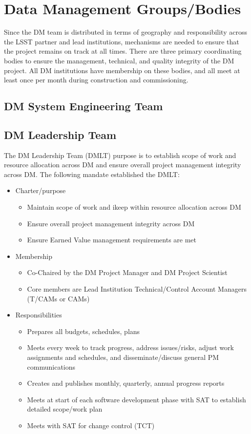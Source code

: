 \section{Data Management Groups/Bodies}
Since the DM team is distributed in terms of geography and responsibility across the LSST partner and lead institutions, mechanisms are needed to ensure that the project remains on track at all times.  There are three primary coordinating bodies to ensure the management, technical, and quality integrity of the DM project.  All DM institutions have membership on these bodies, and all meet at least once per month during construction and commissioning.

\subsection{DM System Engineering Team \label{sect:sysengt}}

\subsection{DM Leadership Team}

The DM Leadership Team (DMLT) purpose is to establish scope of work and resource allocation across DM and ensure overall project management integrity across DM.
The following mandate established the DMLT:

\begin{itemize}
\item Charter/purpose
	\begin{itemize}
	\item Maintain scope of work and ikeep within resource allocation across DM
	\item Ensure overall project management integrity across DM
	\item Ensure Earned Value management requirements are met
	\end{itemize}
\item Membership
	\begin{itemize}
	\item Co-Chaired by the DM Project Manager  and  DM Project Scientist
	\item Core members are Lead Institution Technical/Control Account Managers (T/CAMs or CAMs)
	\end{itemize}
\item Responsibilities
	\begin{itemize}
	\item Prepares all budgets, schedules, plans
	\item Meets every week to track progress, address issues/risks, adjust work assignments and schedules, and disseminate/discuss general PM communications
	\item Creates and publishes monthly, quarterly, annual progress reports
	\item Meets at start of each software development phase with SAT to establish detailed scope/work plan
	\item Meets with SAT for change control (TCT)
	\end{itemize}
\end{itemize}

